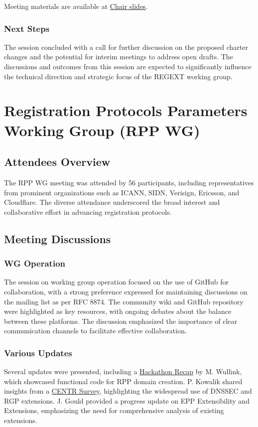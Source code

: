 \documentclass{article}
\begin{document}
Meeting materials are available at \href{https://datatracker.ietf.org/meeting/122/materials/slides-122-regext-sessa-chair-slides-tuesday-01}{Chair slides}.

\subsubsection{Next Steps}
The session concluded with a call for further discussion on the proposed charter changes and the potential for interim meetings to address open drafts. The discussions and outcomes from this session are expected to significantly influence the technical direction and strategic focus of the REGEXT working group.



\newpage

\section{Registration Protocols Parameters Working Group (RPP WG)}

\subsection{Attendees Overview}
The RPP WG meeting was attended by 56 participants, including representatives from prominent organizations such as ICANN, SIDN, Verisign, Ericsson, and Cloudflare. The diverse attendance underscored the broad interest and collaborative effort in advancing registration protocols.

\subsection{Meeting Discussions}

\subsubsection{WG Operation}
The session on working group operation focused on the use of GitHub for collaboration, with a strong preference expressed for maintaining discussions on the mailing list as per RFC 8874. The community wiki and GitHub repository were highlighted as key resources, with ongoing debates about the balance between these platforms. The discussion emphasized the importance of clear communication channels to facilitate effective collaboration.

\subsubsection{Various Updates}
Several updates were presented, including a \href{https://datatracker.ietf.org/meeting/122/materials/slides-122-rpp-hackathon-rpp-01}{Hackathon Recap} by M. Wullink, which showcased functional code for RPP domain creation. P. Kowalik shared insights from a \href{https://datatracker.ietf.org/meeting/122/materials/slides-122-rpp-epp-extensions-analysis-centr-survey-results-01}{CENTR Survey}, highlighting the widespread use of DNSSEC and RGP extensions. J. Gould provided a progress update on EPP Extensibility and Extensions, emphasizing the need for comprehensive analysis of existing extensions.
\end{document}
